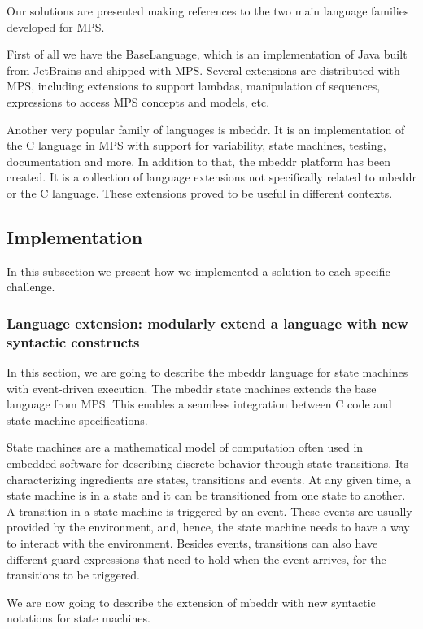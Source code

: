 \documentclass[preprint,numbers,10pt]{sigplanconf}
\begin{document}
Our solutions are presented making references to the two main language families developed for MPS.

First of all we have the BaseLanguage, which is an implementation of Java built from JetBrains and shipped with MPS. Several extensions are distributed with MPS, including extensions to support lambdas, manipulation of sequences, expressions to access MPS concepts and models, etc.

Another very popular family of languages is mbeddr. It is an implementation of the C language in MPS with support for variability, state machines, testing, documentation and more. In addition to that, the mbeddr platform has been created. It is a collection of language extensions not specifically related to mbeddr or the C language. These extensions proved to be useful in different contexts.

\subsection{Implementation}

In this subsection we present how we implemented a solution to each specific challenge.

\subsubsection{Language extension: modularly extend a language with new syntactic constructs}
\label{evr:langext}

In this section, we are going to describe the mbeddr language for state
machines with event-driven execution. The mbeddr state machines extends
the base language from MPS. This enables a seamless integration between
C code and state machine specifications.

State machines are a mathematical model of computation often used in embedded software
for describing discrete behavior through state transitions. Its characterizing
ingredients are states, transitions and events. At any given time, a state
machine is in a state and it can be transitioned from one state to another.
A transition in a state machine is triggered by an event. These events
are usually provided by the environment, and, hence, the state machine
needs to have a way to interact with the environment. Besides events,
transitions can also have different guard expressions that need to hold when
the event arrives, for the transitions to be triggered.

We are now going to describe the extension of mbeddr with new syntactic notations for state machines.
\end{document}
